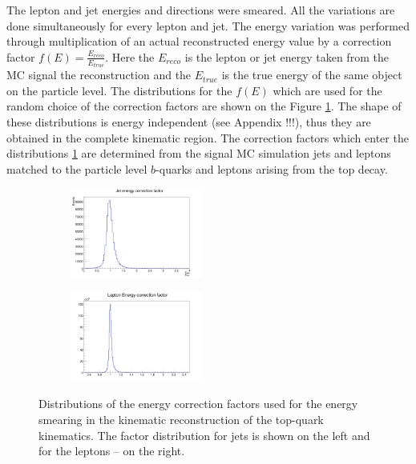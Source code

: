 The lepton and jet energies and directions were smeared. All the variations are done simultaneously for every lepton and jet.
The energy variation was performed through multiplication of an actual reconstructed energy value
by a correction factor $f(E) = \frac{E_{reco}}{E_{true}}$. Here the $E_{reco}$ is the lepton or jet energy taken from the MC signal the reconstruction
and the $E_{true}$ is the true energy of the same object on the particle level. The distributions for the $f(E)$ which are used for the random choice
of the correction factors are shown on the Figure \ref{fig:fE}. The shape of these distributions is energy independent (see Appendix !!!), thus they are obtained in
the complete kinematic region. The correction factors which enter the distributions \ref{fig:fE} are determined from the signal MC simulation jets and 
leptons matched to the particle level $b$-quarks and leptons arising from the top decay. 

\begin{figure}[t]
\centering
\begin{subfigure}
  \centering
  \includegraphics[width=0.48\textwidth]{05_kinReco/plots/fE_jet.png}
\end{subfigure}
\begin{subfigure}
  \centering
  \includegraphics[width=0.48\textwidth]{05_kinReco/plots/fE_lep.png}
\end{subfigure}
\caption{Distributions of the energy correction factors used for the energy smearing in the kinematic
reconstruction of the top-quark kinematics. The factor distribution for jets is shown on the left and for
the leptons -- on the right.}
\label{fig:fE}
\end{figure}

